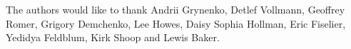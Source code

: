 
The authors would like to thank Andrii Grynenko, Detlef Vollmann, Geoffrey Romer,
Grigory Demchenko, Lee Howes, Daisy Sophia Hollman, Eric Fiselier, Yedidya
Feldblum, Kirk Shoop and Lewis Baker.
